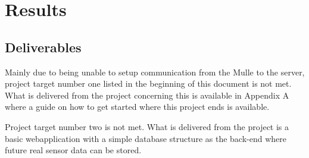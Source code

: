 


\section{Results}
\subsection{Deliverables}
Mainly due to being unable to setup communication from the Mulle to the server, project target number one listed in the beginning of this document is not met.
What is delivered from the project concerning this is available in Appendix A where a guide on how to get started where this project ends is available.

Project target number two is not met.
What is delivered from the project is a basic webapplication with a simple database structure as the back-end where future real sensor data can be stored.


